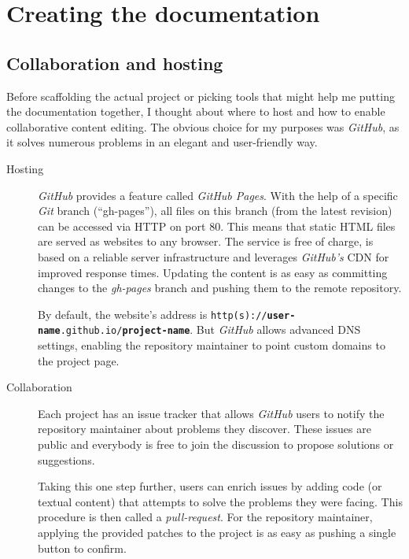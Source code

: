 \section{Creating the documentation}

\subsection{Collaboration and hosting}

Before scaffolding the actual project or picking tools that might help me putting the documentation together, I thought about where to host and how to enable collaborative content editing. The obvious choice for my purposes was \textit{GitHub}, as it solves numerous problems in an elegant and user-friendly way.

\begin{description}

	\item[Hosting]\hfill

	\textit{GitHub} provides a feature called \textit{GitHub Pages}. With the help of a specific \textit{Git} branch (\enquote{gh-pages}), all files on this branch (from the latest revision) can be accessed via \ac{HTTP} on port 80. This means that static \ac{HTML} files are served as websites to any browser. The service is free of charge, is based on a reliable server infrastructure and leverages \textit{GitHub's} \ac{CDN} for improved response times. Updating the content is as easy as committing changes to the \textit{gh-pages} branch and pushing them to the remote repository.

	By default, the website's address is \texttt{http(s)://\allowbreak\textbf{user-name}.github.io/\allowbreak\textbf{project-name}}. But \textit{GitHub} allows advanced \ac{DNS} settings, enabling the repository maintainer to point custom domains to the project page.

	\item[Collaboration]\hfill

	Each project has an issue tracker that allows \textit{GitHub} users to notify the repository maintainer about problems they discover. These issues are public and everybody is free to join the discussion to propose solutions or suggestions.

	Taking this one step further, users can enrich issues by adding code (or textual content) that attempts to solve the problems they were facing. This procedure is then called a \textit{pull-request}. For the repository maintainer, applying the provided patches to the project is as easy as pushing a single button to confirm.


\end{description}
